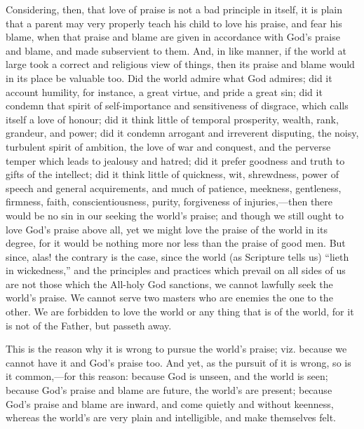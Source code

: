 Considering, then, that love of praise is not a bad principle in
itself, it is plain that a parent may very properly teach his child to
love his praise, and fear his blame, when that praise and blame are
given in accordance with God's praise and blame, and made subservient
to them. And, in like manner, if the world at large took a correct and
religious view of things, then its praise and blame would in its place
be valuable too. Did the world admire what God admires; did it account
humility, for instance, a great virtue, and pride a great sin; did it
condemn that spirit of self-importance and sensitiveness of disgrace,
which calls itself a love of honour; did it think little of temporal
prosperity, wealth, rank, grandeur, and power; did it condemn arrogant
and irreverent disputing, the noisy, turbulent spirit of ambition, the
love of war and conquest, and the perverse temper which leads to
jealousy and hatred; did it prefer goodness and truth to gifts of the
intellect; did it think little of quickness, wit, shrewdness, power of
speech and general acquirements, and much of patience, meekness,
gentleness, firmness, faith, conscientiousness, purity, forgiveness of
injuries,—then there would be no sin in our seeking the world's
praise; and though we still ought to love God's praise above all, yet
we might love the praise of the world in its degree, for it would be
nothing more nor less than the praise of good men. But since, alas!
the contrary is the case, since the world (as Scripture tells us)
``lieth in wickedness,'' and the principles and practices
which prevail on all sides of us are not those which the All-holy God
sanctions, we cannot lawfully seek the world's praise. We cannot serve
two masters who are enemies the one to the other. We are forbidden to
love the world or any thing that is of the world, for it is not of the
Father, but passeth away.

This is the reason why it is wrong to pursue the world's praise;
viz. because we cannot have it and God's praise too. And yet, as the
pursuit of it is wrong, so is it common,—for this reason: because
God is unseen, and the world is seen; because God's praise and blame
are future, the world's are present; because God's praise and blame
are inward, and come quietly and without keenness, whereas the world's
are very plain and intelligible, and make themselves felt.

